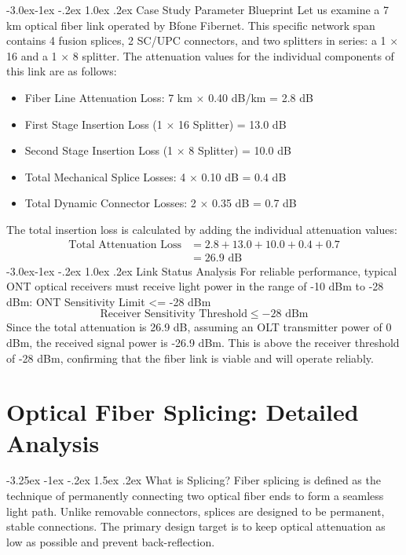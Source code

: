 \documentclass[11pt,a4paper]{report}
\makeatletter
\renewcommand{\section}{\@startsection{section}{1}{\z@}%
  {-3.25ex \@plus -1ex \@minus -.2ex}%
  {1.5ex \@plus.2ex}%
  {\normalfont\Large\bfseries\color{primaryColor}}}
\renewcommand{\subsection}{\@startsection{subsection}{2}{\z@}%
  {-3.0ex\@plus -1ex \@minus -.2ex}%
  {1.0ex \@plus .2ex}%
  {\normalfont\large\bfseries\color{secondaryColor}}}
\makeatother
\begin{document}
\subsection{Case Study Parameter Blueprint}
Let us examine a 7 km optical fiber link operated by Bfone Fibernet. This specific network span contains 4 fusion splices, 2 SC/UPC connectors, and two splitters in series: a 1 $\times$ 16 and a 1 $\times$ 8 splitter. The attenuation values for the individual components of this link are as follows:
\begin{itemize}
  \item Fiber Line Attenuation Loss: 7 km $\times$ 0.40 dB/km = 2.8 dB
  \item First Stage Insertion Loss (1 $\times$ 16 Splitter) = 13.0 dB
  \item Second Stage Insertion Loss (1 $\times$ 8 Splitter) = 10.0 dB
  \item Total Mechanical Splice Losses: 4 $\times$ 0.10 dB = 0.4 dB
  \item Total Dynamic Connector Losses: 2 $\times$ 0.35 dB = 0.7 dB
\end{itemize}
The total insertion loss is calculated by adding the individual attenuation values:
\begin{align*} \text{Total Attenuation Loss} &= 2.8 + 13.0 + 10.0 + 0.4 + 0.7 \\ &= 26.9\text{ dB} \end{align*}
\subsection{Link Status Analysis}
For reliable performance, typical ONT optical receivers must receive light power in the range of -10 dBm to -28 dBm: ONT Sensitivity Limit <= -28 dBm
\begin{equation}\text{Receiver Sensitivity Threshold} \le -28\text{ dBm}\end{equation}
Since the total attenuation is 26.9 dB, assuming an OLT transmitter power of 0 dBm, the received signal power is -26.9 dBm. This is above the receiver threshold of -28 dBm, confirming that the fiber link is viable and will operate reliably.
\chapter{Optical Fiber Splicing: Detailed Analysis}
\section{What is Splicing?}
Fiber splicing is defined as the technique of permanently connecting two optical fiber ends to form a seamless light path. Unlike removable connectors, splices are designed to be permanent, stable connections. The primary design target is to keep optical attenuation as low as possible and prevent back-reflection.
\end{document}
